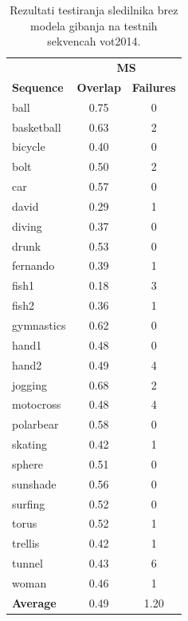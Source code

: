 \documentclass[a4paper]{article}
\begin{document}
\begin{table}[h!]
	\begin{center}
		\begin{tabular}{l c c}
			\hline 
			& \multicolumn{2}{c}{{\bf MS}}\\
			{\bf Sequence} & {\bf Overlap} & {\bf Failures} \\
			\hline 
			ball & 0.75 & 0\\
			basketball & 0.63 & 2\\
			bicycle & 0.40 & 0\\
			bolt & 0.50 & 2\\
			car & 0.57 & 0\\
			david & 0.29 & 1\\
			diving & 0.37 & 0\\
			drunk & 0.53 & 0\\
			fernando & 0.39 & 1\\
			fish1 & 0.18 & 3\\
			fish2 & 0.36 & 1\\
			gymnastics & 0.62 & 0\\
			hand1 & 0.48 & 0\\
			hand2 & 0.49 & 4\\
			jogging & 0.68 & 2\\
			motocross & 0.48 & 4\\
			polarbear & 0.58 & 0\\
			skating & 0.42 & 1\\
			sphere & 0.51 & 0\\
			sunshade & 0.56 & 0\\
			surfing & 0.52 & 0\\
			torus & 0.52 & 1\\
			trellis & 0.42 & 1\\
			tunnel & 0.43 & 6\\
			woman & 0.46 & 1\\
			\hline 
			{\bf Average} & 0.49 & 1.20\\
			\hline 
		\end{tabular}
	\end{center}
	\caption{Rezultati testiranja sledilnika brez modela gibanja na testnih sekvencah vot2014.}
	\label{tabelams}
\end{table}
\end{document}
